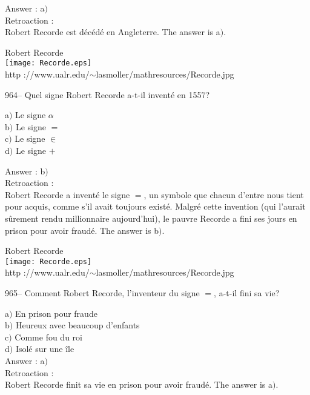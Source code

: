 ﻿\documentclass[letterpaper, 12pt]{article}
\begin{document}
Answer : a$)$\\

Retroaction : \\
Robert Recorde est d\'ec\'ed\'e en Angleterre. The answer is a$)$.\\

        \begin{center}
        Robert Recorde\\
    \texttt{[image: Recorde.eps]}\\
        {\footnotesize http
://www.ualr.edu/$\sim$lasmoller/mathresources/Recorde.jpg}
    \end{center}

964-- Quel signe Robert Recorde a-t-il invent\'e en 1557?

a$)$ Le signe $\alpha$ \\
b$)$ Le signe $=$ \\
c$)$ Le signe $\in$  \\
d$)$ Le signe $+$

Answer : b$)$\\

Retroaction : \\
Robert Recorde a invent\'e le signe $=$, un symbole que chacun
d'entre nous tient pour acquis, comme s'il avait toujours exist\'e.
Malgr\'e cette invention (qui l'aurait s\^urement rendu millionnaire
aujourd'hui), le pauvre Recorde a fini
ses jours en prison pour avoir fraud\'e. The answer is b$)$.\\

        \begin{center}
        Robert Recorde\\
    \texttt{[image: Recorde.eps]}\\
        {\footnotesize http
://www.ualr.edu/$\sim$lasmoller/mathresources/Recorde.jpg}
    \end{center}

965-- Comment Robert Recorde, l'inventeur du signe $=$, a-t-il fini
sa vie?

a$)$ En prison pour fraude \\
b$)$ Heureux avec beaucoup d'enfants  \\
c$)$ Comme fou du roi \\
d$)$ Isol\'e sur une \^ile \\

Answer : a$)$\\

Retroaction :\\
Robert Recorde finit sa vie en prison pour avoir fraud\'e. The answer is
a$)$.\\
\end{document}
